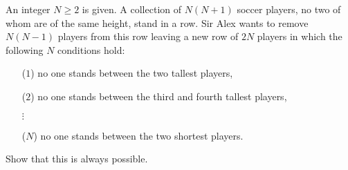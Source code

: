 An integer 
$N \ge 2$
 is given. A collection of 
$N(N + 1)$
 soccer players, no two of whom are of the same height, stand in a row. Sir Alex wants to remove 
$N(N - 1)$
 players from this row leaving a new row of 
$2N$
 players in which the following 
$N$
 conditions hold:
 
\begin{itemize}
    \item[($1$)] no one stands between the two tallest players,
    \item[($2$)] no one stands between the third and fourth tallest players,
    \item[$\vdots\;\;$]
    \item[($N$)] no one stands between the two shortest players.
\end{itemize}

Show that this is always possible.

